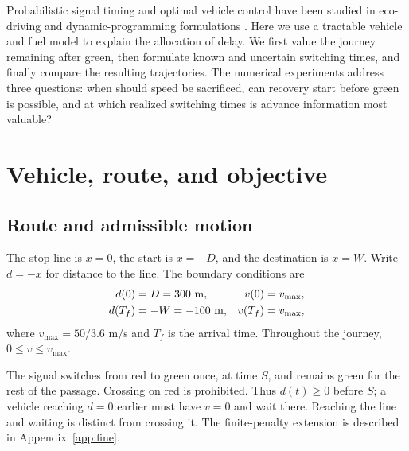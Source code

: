 \documentclass[journal,a4paper,twocolumn]{IEEEtran}
\begin{document}
Probabilistic signal timing and optimal vehicle control have been studied in eco-driving and dynamic-programming formulations \cite{mahler,gaspard}. Here we use a tractable vehicle and fuel model to explain the allocation of delay. We first value the journey remaining after green, then formulate known and uncertain switching times, and finally compare the resulting trajectories. The numerical experiments address three questions: when should speed be sacrificed, can recovery start before green is possible, and at which realized switching times is advance information most valuable?

\section{Vehicle, route, and objective}\label{sec:model}
\subsection{Route and admissible motion}
The stop line is $x=0$, the start is $x=-D$, and the destination is $x=W$. Write $d=-x$ for distance to the line. The boundary conditions are
\begin{align}
 d(0)&=D=300\ \mathrm m, &v(0)&=v_{\max},\notag\\
 d(T_f)&=-W=-100\ \mathrm m, &v(T_f)&=v_{\max},
 \label{eq:init}
\end{align}
where $v_{\max}=50/3.6$ m/s and $T_f$ is the arrival time. Throughout the journey, $0\le v\le v_{\max}$.

The signal switches from red to green once, at time $S$, and remains green for the rest of the passage. Crossing on red is prohibited. Thus $d(t)\ge0$ before $S$; a vehicle reaching $d=0$ earlier must have $v=0$ and wait there. Reaching the line and waiting is distinct from crossing it. The finite-penalty extension is described in Appendix~\ref{app:fine}.
\end{document}
